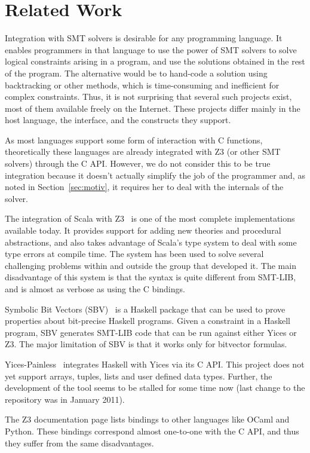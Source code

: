 \section{Related Work}
Integration with SMT solvers is desirable for any programming
language. It enables programmers in that language to use the
power of SMT solvers to solve logical constraints arising in
a program, and use the solutions obtained in the rest of the
program. The alternative would be to hand-code a solution
using backtracking or other methods, which is time-consuming and
inefficient for complex constraints. Thus, it is not
surprising that several such projects exist, most of them
available freely on the Internet. These projects differ
mainly in the host language, the interface, and
the constructs they support.

As most languages support some
form of interaction with C functions, theoretically these
languages are already integrated with Z3 (or other SMT
solvers) through the C API. However, we do not consider
this to be true integration because it doesn't actually simplify the job
of the programmer and, as noted in Section~\ref{sec:motiv}, it
requires her to deal with the internals of the solver.

The integration of Scala with Z3~\cite{scalaz3} is one of the
most complete implementations available today. It provides support for adding
new theories and procedural abstractions, and also takes advantage
of Scala's
type system to deal with some type errors at compile time.
The system has been used to solve several challenging problems
within and outside the group that developed it. The main
disadvantage of this system is that the syntax is quite different from
SMT-LIB, and is almost as verbose as using the C bindings.

Symbolic Bit Vectors (SBV)~\cite{sbv} is a Haskell package that can
be used to prove properties about
bit-precise Haskell programs. Given a constraint in a Haskell
program, SBV generates SMT-LIB code that can be run against
either Yices or Z3.  The major limitation of SBV is that it
works only for bitvector formulas.

Yices-Painless~\cite{yices-painless} integrates Haskell with Yices
via its C API. This project
does not yet support arrays, tuples, lists and user defined
data types. Further, the development of the tool seems to
be stalled for some time now (last change to the repository
was in January 2011).

The Z3 documentation page lists bindings
to other languages like OCaml and Python. These bindings correspond
almost one-to-one with the C API, and thus they suffer from the same
disadvantages.
